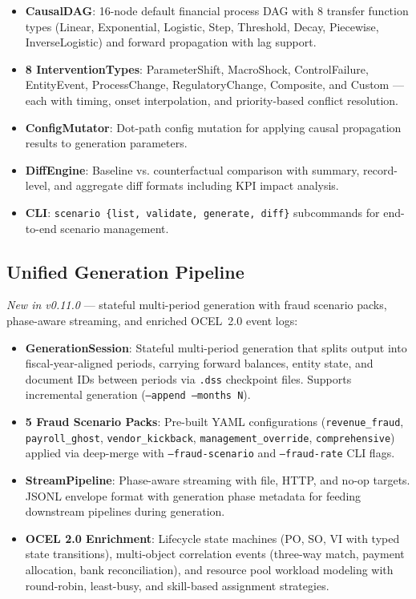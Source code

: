 \documentclass[11pt,a4paper]{article}
\begin{document}
\begin{itemize}[leftmargin=1.4em, itemsep=2pt]
  \item \textbf{CausalDAG}: 16-node default financial process DAG with 8 transfer
        function types (Linear, Exponential, Logistic, Step, Threshold, Decay,
        Piecewise, InverseLogistic) and forward propagation with lag support.
  \item \textbf{8 InterventionTypes}: ParameterShift, MacroShock, ControlFailure,
        EntityEvent, ProcessChange, RegulatoryChange, Composite, and Custom ---
        each with timing, onset interpolation, and priority-based conflict resolution.
  \item \textbf{ConfigMutator}: Dot-path config mutation for applying causal
        propagation results to generation parameters.
  \item \textbf{DiffEngine}: Baseline vs. counterfactual comparison with summary,
        record-level, and aggregate diff formats including KPI impact analysis.
  \item \textbf{CLI}: \texttt{scenario \{list, validate, generate, diff\}} subcommands
        for end-to-end scenario management.
\end{itemize}

\subsection{Unified Generation Pipeline}

\textit{New in v0.11.0} --- stateful multi-period generation with fraud scenario
packs, phase-aware streaming, and enriched OCEL~2.0 event logs:

\begin{itemize}[leftmargin=1.4em, itemsep=2pt]
  \item \textbf{GenerationSession}: Stateful multi-period generation that splits
        output into fiscal-year-aligned periods, carrying forward balances, entity
        state, and document IDs between periods via \texttt{.dss} checkpoint files.
        Supports incremental generation (\texttt{--append --months~N}).
  \item \textbf{5 Fraud Scenario Packs}: Pre-built YAML configurations
        (\texttt{revenue\_fraud}, \texttt{payroll\_ghost}, \texttt{vendor\_kickback},
        \texttt{management\_override}, \texttt{comprehensive}) applied via deep-merge
        with \texttt{--fraud-scenario} and \texttt{--fraud-rate} CLI flags.
  \item \textbf{StreamPipeline}: Phase-aware streaming with file, HTTP, and no-op
        targets. JSONL envelope format with generation phase metadata for feeding
        downstream pipelines during generation.
  \item \textbf{OCEL 2.0 Enrichment}: Lifecycle state machines (PO, SO, VI with
        typed state transitions), multi-object correlation events (three-way match,
        payment allocation, bank reconciliation), and resource pool workload modeling
        with round-robin, least-busy, and skill-based assignment strategies.
\end{itemize}
\end{document}
